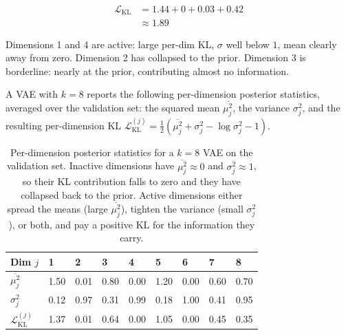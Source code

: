 \begin{align*}
    \mathcal{L}_{\text{KL}} &= 1.44 + 0 + 0.03 + 0.42 \\
                            &\approx 1.89
\end{align*}

Dimensions 1 and 4 are active: large per-dim KL, $\sigma$ well below $1$, mean clearly away from zero. Dimension 2 has collapsed to the prior. Dimension 3 is borderline: nearly at the prior, contributing almost no information.



\vspace{2.5em}


A VAE with $k{=}8$ reports the following per-dimension posterior statistics, averaged over the validation set: the squared mean $\overline{\mu_j^2}$, the variance $\sigma_j^2$, and the resulting per-dimension KL $\mathcal{L}_{\text{KL}}^{(j)} = \tfrac{1}{2}(\overline{\mu_j^2} + \sigma_j^2 - \log \sigma_j^2 - 1)$.

\begin{table}[ht]
\centering
\begin{tabular}{p{}p{}p{}p{}p{}p{}p{}p{}p{}}
    \toprule
    \textbf{Dim $j$}                  & 1    & 2    & 3    & 4    & 5    & 6    & 7    & 8    \\
    \midrule
    $\overline{\mu_j^2}$              & 1.50 & 0.01 & 0.80 & 0.00 & 1.20 & 0.00 & 0.60 & 0.70 \\
    $\sigma_j^2$                      & 0.12 & 0.97 & 0.31 & 0.99 & 0.18 & 1.00 & 0.41 & 0.95 \\
    $\mathcal{L}_{\text{KL}}^{(j)}$   & 1.37 & 0.01 & 0.64 & 0.00 & 1.05 & 0.00 & 0.45 & 0.35 \\
    \bottomrule
\end{tabular}
\vspace{2em}
\caption{Per-dimension posterior statistics for a $k{=}8$ VAE on the validation set. Inactive dimensions have $\overline{\mu_j^2} \approx 0$ and $\sigma_j^2 \approx 1$, so their KL contribution falls to zero and they have collapsed back to the prior. Active dimensions either spread the means (large $\overline{\mu_j^2}$), tighten the variance (small $\sigma_j^2$), or both, and pay a positive KL for the information they carry.}
\label{tab:active_units}
\end{table}

